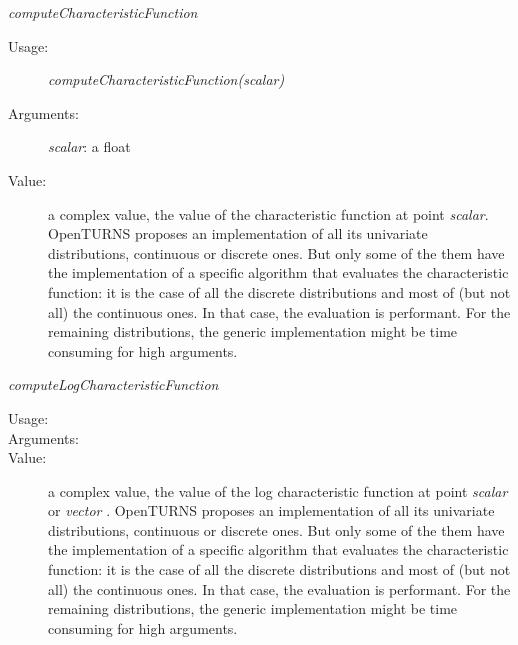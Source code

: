 \begin{description}
\begin{description}
\item \textit{computeCharacteristicFunction}
\begin{description}
\item[Usage:] \textit{computeCharacteristicFunction(scalar)}
\item[Arguments:] \textit{scalar}: a float
\item[Value:] a complex value, the value of the characteristic function at point \textit{scalar}. OpenTURNS proposes an implementation of all its univariate distributions, continuous or discrete ones. But only some of the them have the implementation of a specific algorithm that evaluates the characteristic function: it is the case of all the discrete distributions and most of (but not all) the continuous ones. In that case, the evaluation is performant. For the remaining distributions, the generic implementation might be time consuming for high arguments.
\end{description}
\bigskip

\item \textit{computeLogCharacteristicFunction}
\begin{description}
\item[Usage:]  \rule{0pt}{1em}
\item[Arguments:] \rule{0pt}{1em}
\item[Value:] a complex value, the value of the log characteristic
function at point \textit{scalar} or \textit{vector} . OpenTURNS proposes an implementation of all its univariate distributions, continuous or discrete ones. But only some of the them have the implementation of a specific algorithm that evaluates the characteristic function: it is the case of all the discrete distributions and most of (but not all) the continuous ones. In that case, the evaluation is performant. For the remaining distributions, the generic implementation might be time consuming for high arguments.
\end{description}
\bigskip


\end{description}
\end{description}
